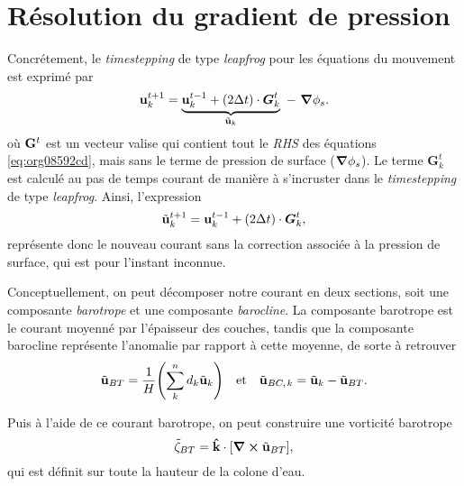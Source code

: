 \documentclass[10pt]{report}
\numberwithin{equation}{section}
\newcommand{\kvf}{\vb{\hat{k}}}
\newcommand{\uu}{\vb{u}}
\newcommand{\pt}{\hspace{1pt}} %
\begin{document}
\section{Résolution du gradient de pression}
\label{sec:orgc462ef0}
\label{orgcee7815}

Concrétement, le \emph{timestepping} de type \emph{leapfrog} pour les équations du mouvement est exprimé par
\begin{equation}
\label{eq:orgc792fed}
 \uu^{t+1}_k = \underbrace{ \uu^{t-1}_k + (2\Delta t)\cdot \vb*{G}^t_k}_{\tilde{\uu}_k} \ -\ \gradient{\phi_s}.
\end{equation}
où \(\vb{G}^t\) est un vecteur valise qui contient tout le \emph{RHS} des équations \ref{eq:org08592cd}, mais sans le terme de pression de surface (\(\gradient{\phi_s}\)).
Le terme \(\boldsymbol{G}_k^t\) est calculé au pas de temps courant de manière à s'incruster dans le \emph{timestepping} de type \emph{leapfrog}.
Ainsi, l'expression
\begin{equation}
   \tilde{\uu}^{t+1}_k = \uu^{t-1}_k + (2\Delta t)\cdot \vb*{G}^t_k,
\end{equation}
représente donc le nouveau courant sans la correction associée à la pression de surface, qui est pour l'instant inconnue.\bigskip


Conceptuellement, on peut décomposer notre courant en deux sections, soit une composante \emph{barotrope} et une composante \emph{barocline}.
La composante barotrope est le courant moyenné par l'épaisseur des couches, tandis que la composante barocline représente l'anomalie par rapport à cette moyenne, de sorte à retrouver
\begin{subequations}
\begin{align}
 && \tilde{\uu}_{BT} = \frac{1}{H} \qty(\sum_k^n d_k \tilde{\uu}_k) && \text{et}
 && \tilde{\uu}_{BC,\pt k} = \tilde{\uu}_k - \tilde{\uu}_{BT}. &&
\end{align}
\end{subequations}

Puis à l'aide de ce courant barotrope, on peut construire une vorticité barotrope
\begin{equation}
 \tilde{\zeta}_{BT} = \kvf \cdot \qty[\curl{\tilde{\uu}_{BT}}],
\end{equation}
qui est définit sur toute la hauteur de la colone d'eau.\bigskip
\end{document}
